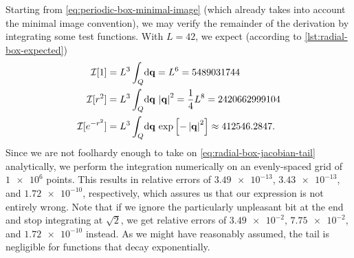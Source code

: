 Starting from \cref{eq:periodic-box-minimal-image} (which already takes into account the minimal image convention), we may verify the remainder of the derivation by integrating some test functions.
With $L = 42$, we expect (according to \vref{lst:radial-box-expected})
\begin{subequations} \label{eq:radial-box-expected}
\begin{align}
	\mathcal{I}[1]
	&= L^3 \int_\cube\! \dif \vec{q}
	= L^6
	= 5489031744 \\
	\mathcal{I}[r^2]
	&= L^3 \int_\cube\! \dif \vec{q} \, \abs[0]{\vec{q}}^2
	= \frac{1}{4} L^8
	= 2420662999104 \\
	\mathcal{I}[e^{-r^2}]
	&= L^3 \int_\cube\! \dif \vec{q} \, \expb{-\abs[0]{\vec{q}}^2}
	\approx 412546.2847.
\end{align}
\end{subequations}
Since we are not foolhardy enough to take on \cref{eq:radial-box-jacobian-tail} analytically, we perform the integration numerically on an evenly-spaced grid of $\num{1e6}$ points.
This results in relative errors of $\num{3.49e-13}$, $\num{3.43e-13}$, and $\num{1.72e-10}$, respectively, which assures us that our expression is not entirely wrong.
Note that if we ignore the particularly unpleasant bit at the end and stop integrating at $\sqrt{2}$, we get relative errors of $\num{3.49e-2}$, $\num{7.75e-2}$, and $\num{1.72e-10}$ instead.
As we might have reasonably assumed, the tail is negligible for functions that decay exponentially.
